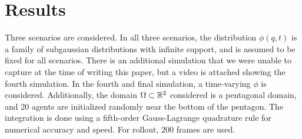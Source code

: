 \documentclass[10pt,conference]{IEEEtran}
\begin{document}
\section{Results}
Three scenarios are considered. In all three scenarios, the distribution $\phi(q,t)$ is a family of subgaussian distributions with infinite support, and is assumed to be fixed for all scenarios. There is an additional simulation that we were unable to capture at the time of writing this paper, but a video is attached showing the fourth simulation. In the fourth and final simulation, a time-varying $\phi$ is considered. Additionally, the domain $\Omega \subset \mathbb{R}^2$ considered is a pentagonal domain, and 20 agents are initialized randomly near the bottom of the pentagon. The integration is done using a fifth-order Gauss-Lagrange quadrature rule for numerical accuracy and speed. For rollout, $200$ frames are used. 
\end{document}

